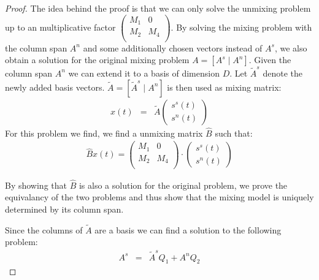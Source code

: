 \documentclass[a4paper, 12pt, titlepage]{article}
\begin{document}
\begin{proof}
	The idea behind the proof is that we can only solve the unmixing problem up to an multiplicative factor $\left(
		\begin{array}{cc}
			M_1& 0\\
			M_2 & M_4 \\
		\end{array}
	\right)$.
	By solving the mixing problem with the column span $A^n$ and some additionally chosen vectors instead of $A^s$, we also obtain a solution for the original mixing problem $A=\left[ A^s \mid A^n \right]$.
	Given the column span $A^n$ we can extend it to a basis of dimension $D$.
	Let $\tilde A^s$ denote the newly added basis vectors.
	$\tilde A = \left [ \tilde A^s \mid A^n \right]$ is then used as mixing matrix:
	\begin{eqnarray}
		x(t) &=& \tilde A \left(
		\begin{array}{c}
			s^s(t)\\
			s^n(t)
		\end{array}
		\right)
	\end{eqnarray}
	For this problem we find, we find a unmixing matrix $\hat B$ such that:
	\begin{eqnarray}
		\hat B x(t) = \left(
		\begin{array}{cc}
			M_1& 0\\
			M_2 & M_4 \\
		\end{array}
	\right) \cdot  \left(
		\begin{array}{c}
			s^s(t)\\
			s^n(t)
		\end{array}
		\right)
	\end{eqnarray}
	
	By showing that $\hat B$ is also a solution for the original problem, we prove the equivalancy of the two problems and thus show that the mixing model is uniquely determined by its column span.
	
	Since the columns of $\tilde A$ are a basis we can find a solution to the following problem:
	\begin{eqnarray}
		A^s &=& \tilde A^s Q_1 + A^n Q_2	
	\end{eqnarray}
	

\end{proof}
\end{document}
